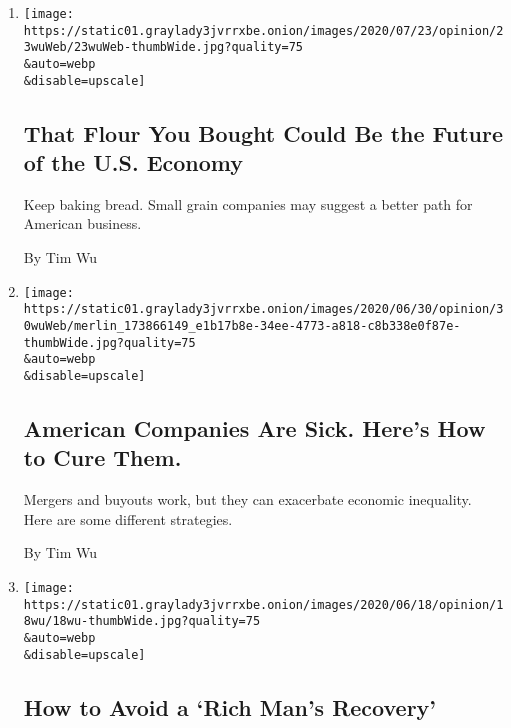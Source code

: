 \begin{enumerate}
\def\labelenumi{\arabic{enumi}.}
\item
  \href{/2020/07/24/opinion/us-grain-industry.html}{}

  \texttt{[image: https://static01.graylady3jvrrxbe.onion/images/2020/07/23/opinion/23wuWeb/23wuWeb-thumbWide.jpg?quality=75\\\&auto=webp\\\&disable=upscale]}

  \hypertarget{that-flour-you-bought-could-be-the-future-of-the-us-economy}{%
  \subsection{That Flour You Bought Could Be the Future of the U.S.
  Economy}\label{that-flour-you-bought-could-be-the-future-of-the-us-economy}}

  Keep baking bread. Small grain companies may suggest a better path for
  American business.

  By Tim Wu
\item
  \href{/2020/06/30/opinion/sunday/mergers-buyouts-economy-inequality.html}{}

  \texttt{[image: https://static01.graylady3jvrrxbe.onion/images/2020/06/30/opinion/30wuWeb/merlin\_173866149\_e1b17b8e-34ee-4773-a818-c8b338e0f87e-thumbWide.jpg?quality=75\\\&auto=webp\\\&disable=upscale]}

  \hypertarget{american-companies-are-sick-heres-how-to-cure-them}{%
  \subsection{American Companies Are Sick. Here's How to Cure
  Them.}\label{american-companies-are-sick-heres-how-to-cure-them}}

  Mergers and buyouts work, but they can exacerbate economic inequality.
  Here are some different strategies.

  By Tim Wu
\item
  \href{/2020/06/18/opinion/covid-economic-recovery-inequality.html}{}

  \texttt{[image: https://static01.graylady3jvrrxbe.onion/images/2020/06/18/opinion/18wu/18wu-thumbWide.jpg?quality=75\\\&auto=webp\\\&disable=upscale]}

  \hypertarget{how-to-avoid-a-rich-mans-recovery}{%
  \subsection{How to Avoid a `Rich Man's
  Recovery'}\label{how-to-avoid-a-rich-mans-recovery}}


\end{enumerate}

